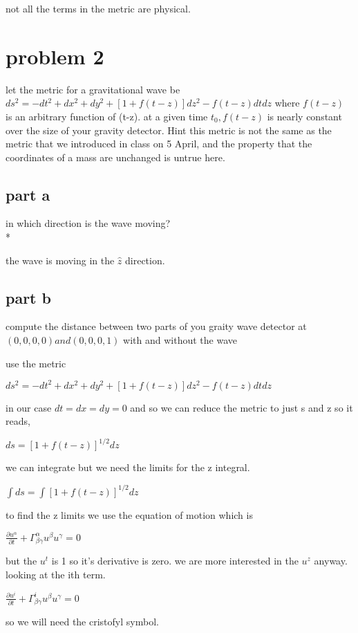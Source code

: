 \documentclass{article}
\begin{document}
not all the terms in the metric are physical.

\newpage

\section{problem 2}
let the metric for a gravitational wave be $ds^{2}=-dt^{2}+dx^{2}+dy^{2}+[1+f(t-z)]dz^{2}-f(t-z)dtdz$ where $f(t-z)$ is an arbitrary function of (t-z). at a given time $t_{0}, f(t-z)$ is nearly constant over the size of your gravity detector. Hint this metric is not the same as the metric that we introduced in class on 5 April, and the property that the coordinates of a mass are unchanged is untrue here. 

\subsection{part a}
in which direction is the wave moving?
\\*

the wave is moving in the $\hat{z}$ direction. 

\subsection{part b}
compute the distance between two parts of you graity wave detector at $(0,0,0,0) and (0,0,0,1)$ with and without the wave

use the metric 

$ds^{2}=-dt^{2}+dx^{2}+dy^{2}+[1+f(t-z)]dz^{2}-f(t-z)dtdz$

in our case $dt=dx=dy=0$ and so we can reduce the metric to just s and z so it reads, 

$ds=[1+f(t-z)]^{1/2}dz$

we can integrate but we need the limits for the z integral. 

$\int ds=\int [1+f(t-z)]^{1/2}dz$

to find the z limits we use the equation of motion which is 

$\frac{\partial u^{\alpha}}{\partial t}+\Gamma^{\alpha}_{\beta\gamma}u^{\beta}u^{\gamma}=0$

but the $u^{t}$ is 1 so it's derivative is zero. we are more interested in the $u^{z}$ anyway. looking at the ith term. 

$\frac{\partial u^{i}}{\partial t}+\Gamma^{i}_{\beta\gamma}u^{\beta}u^{\gamma}=0$


so we will need the cristofyl symbol. 
\end{document}
